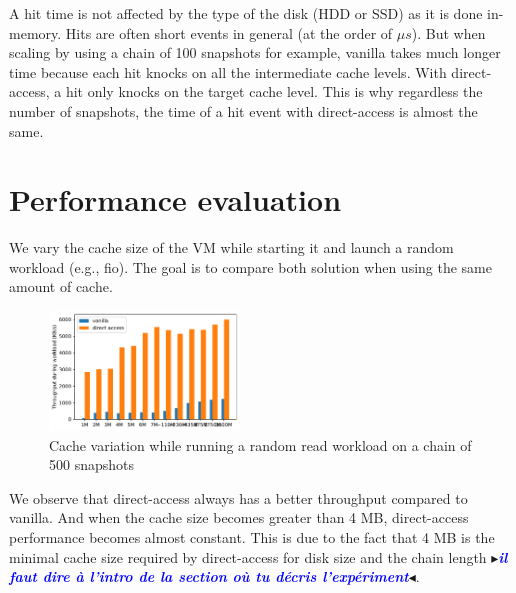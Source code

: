 \documentclass[sigplan,screen,10pt]{acmart}
\newcommand{\mynote}[2]{\fbox{\bfseries\sffamily\footnotesize{\textbf{#1}}}
 {\small$\blacktriangleright$\textsf{\emph{#2}}$\blacktriangleleft$}}
\newcommand{\mynote}[2]{}
\newcommand{\stella}[1]{\mynote{\textcolor{red}{Stella}}{\textcolor{blue}{\textbf{#1}}}}
\begin{document}
	A hit time is not affected by the type of the disk (HDD or SSD) as it is done in-memory.
	Hits are often short events in general (at the order of $\mu s$). 
	But when scaling by using a chain of 100 snapshots for example, vanilla takes much longer time because each hit knocks on all the intermediate cache levels.
	With direct-access, a hit only knocks on the target cache level. 
	This is why regardless the number of snapshots, the time of a hit event with direct-access is almost the same.

	\section*{Performance evaluation}
	
	We vary the cache size of the VM while starting it and launch a random workload (e.g., fio).
	The goal is to compare both solution when using the same amount of cache. 
	
	\begin{figure}[h]
		\center
		\includegraphics[width=0.45\textwidth]{cache_variation.pdf}
		\caption{Cache variation while running a random read workload on a chain of 500 snapshots}
		\label{fig:fig-c}
	\end{figure}

	We observe that direct-access always has a better throughput compared to vanilla.
	And when the cache size becomes greater than 4 MB, direct-access performance becomes almost constant. 
	This is due to the fact that 4 MB is the minimal cache size required by direct-access for disk size and the chain length \stella{il faut dire à l'intro de la section où tu décris l'expériment}.
	
\end{document}
